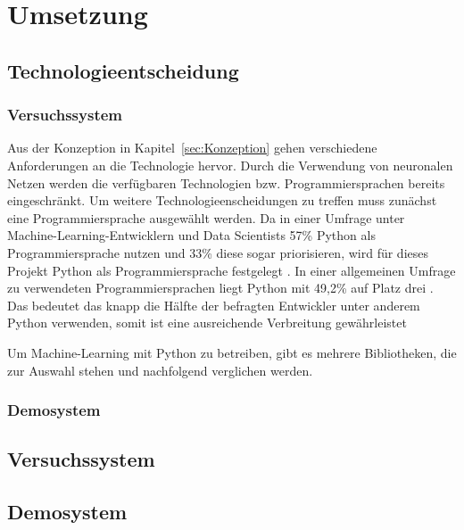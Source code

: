 \section{Umsetzung}

\subsection{Technologieentscheidung}
\subsubsection{Versuchssystem}
Aus der Konzeption in Kapitel~\ref{sec:Konzeption} gehen verschiedene Anforderungen an die Technologie hervor.
Durch die Verwendung von neuronalen Netzen werden die verfügbaren Technologien bzw. Programmiersprachen bereits eingeschränkt.
Um weitere Technologieenscheidungen zu treffen muss zunächst eine Programmiersprache ausgewählt werden.
Da in einer Umfrage unter Machine-Learning-Entwicklern und Data Scientists 57\% Python als Programmiersprache nutzen und 33\% diese sogar priorisieren, wird für dieses Projekt Python als Programmiersprache festgelegt \autocite[vgl. ][S. 16]{vision_mobile_state_2017}.
In einer allgemeinen Umfrage zu verwendeten Programmiersprachen liegt Python mit 49,2\% auf Platz drei \autocite[vgl.][]{yepis_2023_2023}.
Das bedeutet das knapp die Hälfte der befragten Entwickler unter anderem Python verwenden, somit ist eine ausreichende Verbreitung gewährleistet

Um Machine-Learning mit Python zu betreiben, gibt es mehrere Bibliotheken, die zur Auswahl stehen und nachfolgend verglichen werden.


\subsubsection{Demosystem}

\subsection{Versuchssystem}
\subsection{Demosystem}